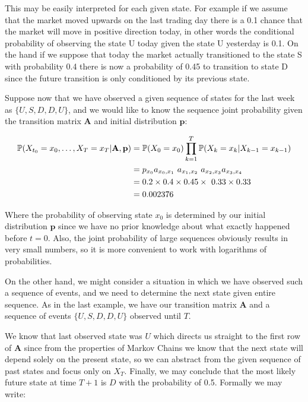 This may be easily interpreted for each given state. For example if we assume that the market moved upwards on the last trading day there is a 0.1 chance that the market will move in positive direction today, in other words the conditional probability of observing the state U today given the state U yesterday is 0.1. 
On the hand if we suppose that today the market actually transitioned to the state S with probability 0.4 there is now a probability of 0.45 to transition to state D since the future transition is only conditioned by its previous state. 

Suppose now that we have observed a given sequence of states for the last week as $\{U,S,D,D,U\}$, and we would like to know the sequence joint probability given the transition matrix $\textbf{A}$ and initial distribution $\textbf{p}$:

\begin{align}
\mathbb{P}(X_{t_0} = x_0,\ldots,X_{T} = x_T|\textbf{A},\textbf{p}) &= \mathbb{P}(X_0 = x_0) \prod_{k=1}^{T} \mathbb{P}(X_k=x_k|X_{k-1}=x_{k-1})\\
&= p_{x_0} a_{x_0,x_1}  a_{x_1,x_2}  a_{x_2,x_3} a_{x_3,x_4} \notag\\
&= 0.2 \times 0.4 \times 0.45 \times 0.33 \times 0.33 \notag\\
&= 0.002376 \notag
\end{align}

Where the probability of observing state $x_0$ is determined by our initial distribution $\textbf{p}$ since we have no prior knowledge about what exactly happened before $t=0$. 
Also, the joint probability of large sequences obviously results in very small numbers, so it is more convenient to work with logarithms of probabilities.

On the other hand, we might consider a situation in which we have observed such a sequence of events, 
and we need to determine the next state given entire sequence. As in the last example, 
we have our transition matrix $\textbf{A}$ and a sequence of events $\{U,S,D,D,U\}$ observed until $T$. 

We know that last observed state was $U$ which directs us straight to the first row of $\textbf{A}$ since from the properties of Markov Chains we know that the next state will depend solely on the present state, 
so we can abstract from the given sequence of past states and focus only on $X_{T}$. Finally, we may conclude that the most likely future state at time $T+1$ is $D$ with the probability of 0.5. Formally we may write:


